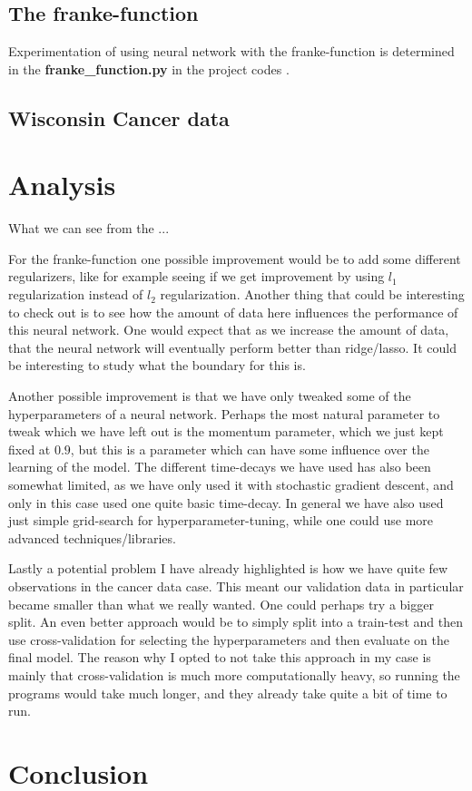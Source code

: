 \documentclass{article}
\begin{document}
\subsection{The franke-function}
Experimentation of using neural network with the franke-function is determined
in the \textbf{franke\_function.py} in the project codes
\cite{githubrepoproject2code}.

\subsection{Wisconsin Cancer data}

\section{Analysis}
What we can see from the ...

For the franke-function one possible improvement would be to add some different
regularizers, like for example seeing if we get improvement by using $l_1$
regularization instead of $l_2$ regularization. Another thing that could be
interesting to check out is to see how the amount of data here influences the
performance of this neural network.  One would expect that as we increase the
amount of data, that the neural network will eventually perform better than
ridge/lasso. It could be interesting to study what the boundary for this is.

Another possible improvement is that we have only tweaked some of the
hyperparameters of a neural network. Perhaps the most natural parameter to tweak
which we have left out is the momentum parameter, which we just kept fixed at
$0.9$, but this is a parameter which can have some influence over the learning
of the model. The different time-decays we have used has also been somewhat
limited, as we have only used it with stochastic gradient descent, and only in
this case used one quite basic time-decay. In general we have also used just
simple grid-search for hyperparameter-tuning, while one could use more advanced
techniques/libraries.

Lastly a potential problem I have already highlighted is how we have quite few
observations in the cancer data case. This meant our validation data in
particular became smaller than what we really wanted. One could perhaps try a
bigger split. An even better approach would be to simply split into a train-test
and then use cross-validation for selecting the hyperparameters and then
evaluate on the final model. The reason why I opted to not take this approach in
my case is mainly that cross-validation is much more computationally heavy, so
running the programs would take much longer, and they already take quite a bit
of time to run.

\section{Conclusion}


\end{document}
